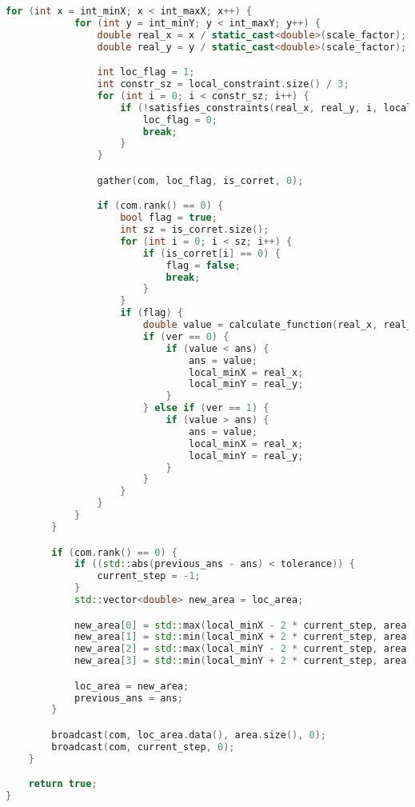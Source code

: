 \documentclass[a4paper,12pt]{article}
\begin{document}
\begin{lstlisting}[language=C++, caption=Код параллельной версии]
        for (int x = int_minX; x < int_maxX; x++) {
            for (int y = int_minY; y < int_maxY; y++) {
                double real_x = x / static_cast<double>(scale_factor);
                double real_y = y / static_cast<double>(scale_factor);

                int loc_flag = 1;
                int constr_sz = local_constraint.size() / 3;
                for (int i = 0; i < constr_sz; i++) {
                    if (!satisfies_constraints(real_x, real_y, i, local_constraint)) {
                        loc_flag = 0;
                        break;
                    }
                }

                gather(com, loc_flag, is_corret, 0);

                if (com.rank() == 0) {
                    bool flag = true;
                    int sz = is_corret.size();
                    for (int i = 0; i < sz; i++) {
                        if (is_corret[i] == 0) {
                            flag = false;
                            break;
                        }
                    }
                    if (flag) {
                        double value = calculate_function(real_x, real_y, funct);
                        if (ver == 0) {
                            if (value < ans) {
                                ans = value;
                                local_minX = real_x;
                                local_minY = real_y;
                            }
                        } else if (ver == 1) {
                            if (value > ans) {
                                ans = value;
                                local_minX = real_x;
                                local_minY = real_y;
                            }
                        }
                    }
                }
            }
        }

        if (com.rank() == 0) {
            if ((std::abs(previous_ans - ans) < tolerance)) {
                current_step = -1;
            }
            std::vector<double> new_area = loc_area;

            new_area[0] = std::max(local_minX - 2 * current_step, area[0]);
            new_area[1] = std::min(local_minX + 2 * current_step, area[1]);
            new_area[2] = std::max(local_minY - 2 * current_step, area[2]);
            new_area[3] = std::min(local_minY + 2 * current_step, area[3]);

            loc_area = new_area;
            previous_ans = ans;
        }

        broadcast(com, loc_area.data(), area.size(), 0);
        broadcast(com, current_step, 0);
    }

    return true;
}
\end{lstlisting}
\end{document}
